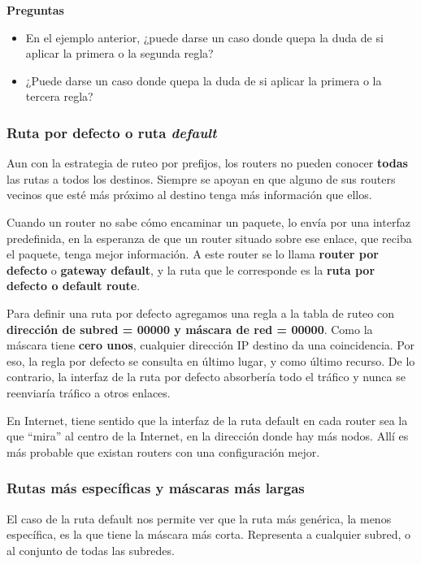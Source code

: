 \documentclass[spanish,A4,]{article}
\begin{document}
\textbf{Preguntas}

\begin{itemize}
\itemsep1pt\parskip0pt
\item
  En el ejemplo anterior, ¿puede darse un caso donde quepa la duda de si
  aplicar la primera o la segunda regla?
\item
  ¿Puede darse un caso donde quepa la duda de si aplicar la primera o la
  tercera regla?
\end{itemize}

\subsubsection{Ruta por defecto o ruta
\emph{default}}\label{ruta-por-defecto-o-ruta-default}

Aun con la estrategia de ruteo por prefijos, los routers no pueden
conocer \textbf{todas} las rutas a todos los destinos. Siempre se apoyan
en que alguno de sus routers vecinos que esté más próximo al destino
tenga más información que ellos.

Cuando un router no sabe cómo encaminar un paquete, lo envía por una
interfaz predefinida, en la esperanza de que un router situado sobre ese
enlace, que reciba el paquete, tenga mejor información. A este router se
lo llama \textbf{router por defecto} o \textbf{gateway default}, y la
ruta que le corresponde es la \textbf{ruta por defecto o default route}.

Para definir una ruta por defecto agregamos una regla a la tabla de
ruteo con \textbf{dirección de subred = 00000 y máscara de red = 00000}.
Como la máscara tiene \textbf{cero unos}, cualquier dirección IP destino
da una coincidencia. Por eso, la regla por defecto se consulta en último
lugar, y como último recurso. De lo contrario, la interfaz de la ruta
por defecto absorbería todo el tráfico y nunca se reenviaría tráfico a
otros enlaces.

En Internet, tiene sentido que la interfaz de la ruta default en cada
router sea la que ``mira'' al centro de la Internet, en la dirección
donde hay más nodos. Allí es más probable que existan routers con una
configuración mejor.

\subsubsection{Rutas más específicas y máscaras más
largas}\label{rutas-muxe1s-especuxedficas-y-muxe1scaras-muxe1s-largas}

El caso de la ruta default nos permite ver que la ruta más genérica, la
menos específica, es la que tiene la máscara más corta. Representa a
cualquier subred, o al conjunto de todas las subredes.
\end{document}
